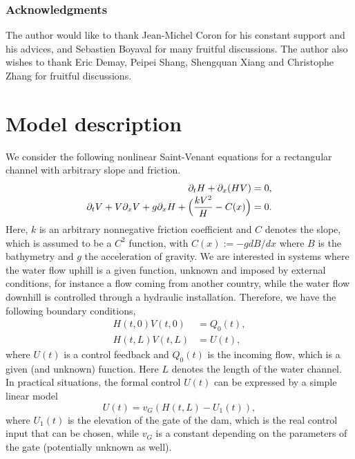 \subsubsection*{Acknowledgments}
The author would like to thank Jean-Michel Coron for his constant support and his advices, and Sebastien Boyaval for many fruitful discussions.
The author also wishes to thank Eric Demay, Peipei Shang, Shengquan Xiang and Christophe Zhang for fruitful discussions.

\section{Model description}
\label{s1}
We
consider
the following nonlinear Saint-Venant equations for a rectangular channel with arbitrary slope and friction.\vspace*{-3pt}
\begin{equation}
\begin{split}
\partial_{t}H+\partial_{x}(HV)&=0,\\[-3pt]
\partial_{t}V+V\partial_{x}V+g\partial_{x}H+\Bigl(\frac{kV^{2}}{H}-C(x)\Bigr)&=0.
\end{split}
\label{Stvenant}
\end{equation}
Here, $k$ is an arbitrary nonnegative friction coefficient and $C$ denotes the slope, which is assumed to be a $C^{2}$ function, with $C(x):=-gdB/dx$ where $B$ is the bathymetry and $g$ the acceleration of gravity.
We are interested in systems where the water flow uphill is a given function, unknown and imposed by external conditions, for instance a flow coming from another country, while the water flow downhill is controlled through a hydraulic installation. Therefore, we have the following boundary conditions,
\begin{equation}
\begin{split}
H(t,0)V(t,0)&=Q_{0}(t),\\
H(t,L)V(t,L)&=U(t),
\end{split}
\label{boundary02}
\end{equation}
where $U(t)$
is a control feedback and $Q_{0}(t)$
is the incoming flow, which is a given (and unknown) function. Here $L$ denotes the length of the water channel.
In practical situations, the formal control $U(t)$ can be expressed by a simple linear model \cite{BastinCoronPI}
\begin{equation}
U(t)=v_{G}(H(t,L)-U_{1}(t)),
\label{vG}
\end{equation}
where $U_{1}(t)$ is the elevation of the gate of the dam, which is the real control input that can be chosen, while $v_{G}$ is a constant depending on the parameters of the gate (potentially unknown as well).

